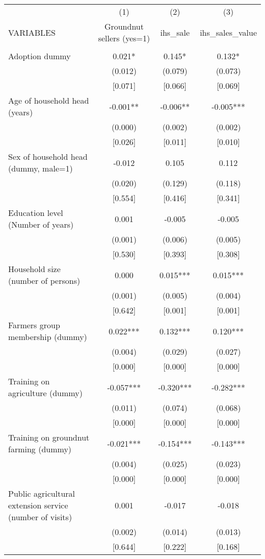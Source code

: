 \documentclass[]{article}
\begin{document}
\begin{tabular}{lccc} \hline
 & (1) & (2) & (3) \\
VARIABLES & Groundnut sellers (yes=1) & ihs\_sale & ihs\_sales\_value \\ \hline
 &  &  &  \\
Adoption dummy & 0.021* & 0.145* & 0.132* \\
 & (0.012) & (0.079) & (0.073) \\
 & [0.071] & [0.066] & [0.069] \\
Age of household head (years) & -0.001** & -0.006** & -0.005*** \\
 & (0.000) & (0.002) & (0.002) \\
 & [0.026] & [0.011] & [0.010] \\
Sex of household head (dummy, male=1) & -0.012 & 0.105 & 0.112 \\
 & (0.020) & (0.129) & (0.118) \\
 & [0.554] & [0.416] & [0.341] \\
Education level (Number of years) & 0.001 & -0.005 & -0.005 \\
 & (0.001) & (0.006) & (0.005) \\
 & [0.530] & [0.393] & [0.308] \\
Household size (number of persons) & 0.000 & 0.015*** & 0.015*** \\
 & (0.001) & (0.005) & (0.004) \\
 & [0.642] & [0.001] & [0.001] \\
Farmers group membership (dummy) & 0.022*** & 0.132*** & 0.120*** \\
 & (0.004) & (0.029) & (0.027) \\
 & [0.000] & [0.000] & [0.000] \\
Training on agriculture (dummy) & -0.057*** & -0.320*** & -0.282*** \\
 & (0.011) & (0.074) & (0.068) \\
 & [0.000] & [0.000] & [0.000] \\
Training on groundnut farming (dummy) & -0.021*** & -0.154*** & -0.143*** \\
 & (0.004) & (0.025) & (0.023) \\
 & [0.000] & [0.000] & [0.000] \\
Public agricultural extension service (number of visits) & 0.001 & -0.017 & -0.018 \\
 & (0.002) & (0.014) & (0.013) \\
 & [0.644] & [0.222] & [0.168] \\

\end{tabular}
\end{document}
